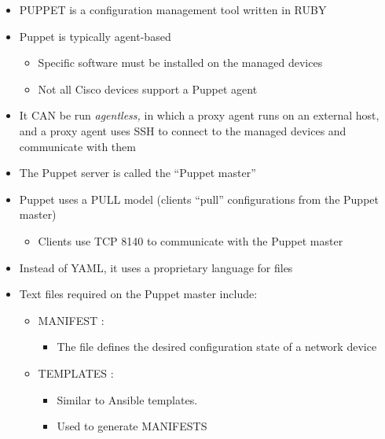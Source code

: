 \begin{itemize}
\tightlist
\item
  PUPPET is a configuration management tool written in RUBY
\item
  Puppet is typically agent-based

  \begin{itemize}
  \tightlist
  \item
    Specific software must be installed on the managed devices
  \item
    Not all Cisco devices support a Puppet agent
  \end{itemize}
\item
  It CAN be run \emph{agentless,} in which a proxy agent runs on an
  external host, and a proxy agent uses SSH to connect to the managed
  devices and communicate with them
\item
  The Puppet server is called the ``Puppet master''
\item
  Puppet uses a PULL model (clients ``pull'' configurations from the
  Puppet master)

  \begin{itemize}
  \tightlist
  \item
    Clients use TCP 8140 to communicate with the Puppet master
  \end{itemize}
\item
  Instead of YAML, it uses a proprietary language for files
\item
  Text files required on the Puppet master include:

  \begin{itemize}
  \tightlist
  \item
    MANIFEST :

    \begin{itemize}
    \tightlist
    \item
      The file defines the desired configuration state of a network
      device
    \end{itemize}
  \item
    TEMPLATES :

    \begin{itemize}
    \tightlist
    \item
      Similar to Ansible templates.
    \item
      Used to generate MANIFESTS
    \end{itemize}
  \end{itemize}
\end{itemize}

